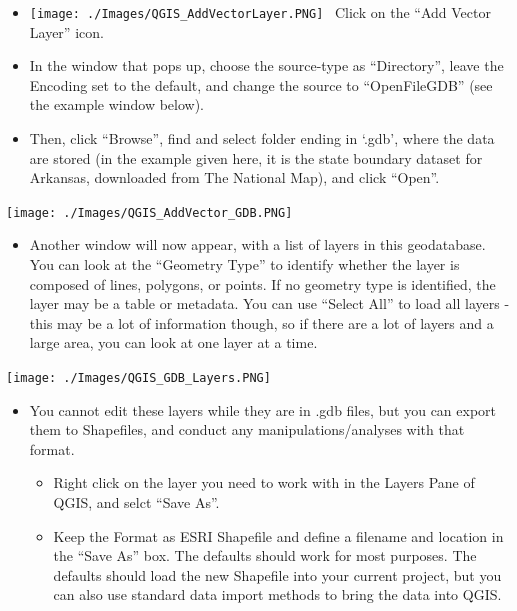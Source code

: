 \documentclass[12pt,]{article}
\begin{document}
\begin{itemize}
\item
  \texttt{[image: ./Images/QGIS\_AddVectorLayer.PNG]}~ Click on the ``Add
  Vector Layer'' icon.
\item
  In the window that pops up, choose the source-type as ``Directory'',
  leave the Encoding set to the default, and change the source to
  ``OpenFileGDB'' (see the example window below).
\item
  Then, click ``Browse'', find and select folder ending in `.gdb', where
  the data are stored (in the example given here, it is the state
  boundary dataset for Arkansas, downloaded from The National Map), and
  click ``Open''.
\end{itemize}

\texttt{[image: ./Images/QGIS\_AddVector\_GDB.PNG]}\\

\begin{itemize}
\itemsep1pt\parskip0pt
\item
  Another window will now appear, with a list of layers in this
  geodatabase. You can look at the ``Geometry Type'' to identify whether
  the layer is composed of lines, polygons, or points. If no geometry
  type is identified, the layer may be a table or metadata. You can use
  ``Select All'' to load all layers - this may be a lot of information
  though, so if there are a lot of layers and a large area, you can look
  at one layer at a time.
\end{itemize}

\texttt{[image: ./Images/QGIS\_GDB\_Layers.PNG]}\\

\begin{itemize}
\itemsep1pt\parskip0pt
\item
  You cannot edit these layers while they are in .gdb files, but you can
  export them to Shapefiles, and conduct any manipulations/analyses with
  that format.

  \begin{itemize}
  \itemsep1pt\parskip0pt
  \item
    Right click on the layer you need to work with in the Layers Pane of
    QGIS, and selct ``Save As''.
  \item
    Keep the Format as ESRI Shapefile and define a filename and location
    in the ``Save As'' box. The defaults should work for most purposes.
    The defaults should load the new Shapefile into your current
    project, but you can also use standard data import methods to bring
    the data into QGIS.
  \end{itemize}
\end{itemize}
\end{document}
